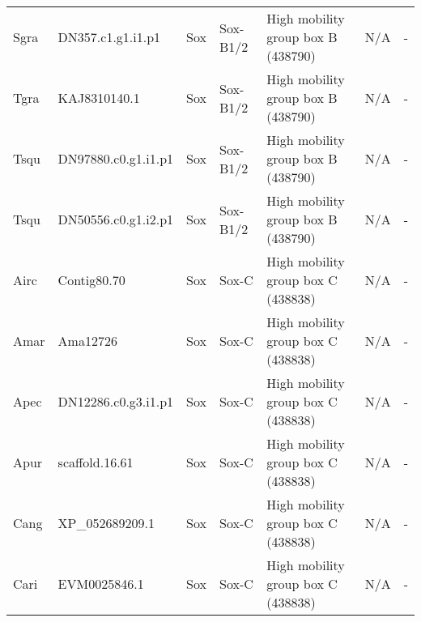 \documentclass[../main.tex]{subfiles}
\begin{document}
\begin{landscape}
\begin{longtable}{lllllll}
		Sgra           & DN357.c1.g1.i1.p1     & Sox            & Sox-B1/2            & High mobility group box B (438790)          & N/A                                                                    & -                    \\
		Tgra           & KAJ8310140.1          & Sox            & Sox-B1/2            & High mobility group box B (438790)          & N/A                                                                    & -                    \\
		Tsqu           & DN97880.c0.g1.i1.p1   & Sox            & Sox-B1/2            & High mobility group box B (438790)          & N/A                                                                    & -                    \\
		Tsqu           & DN50556.c0.g1.i2.p1   & Sox            & Sox-B1/2            & High mobility group box B (438790)          & N/A                                                                    & -                    \\
		Airc           & Contig80.70           & Sox            & Sox-C               & High mobility group box C (438838)          & N/A                                                                    & -                    \\
		Amar           & Ama12726              & Sox            & Sox-C               & High mobility group box C (438838)          & N/A                                                                    & -                    \\
		Apec           & DN12286.c0.g3.i1.p1   & Sox            & Sox-C               & High mobility group box C (438838)          & N/A                                                                    & -                    \\
		Apur           & scaffold.16.61        & Sox            & Sox-C               & High mobility group box C (438838)          & N/A                                                                    & -                    \\
		Cang           & XP\_052689209.1       & Sox            & Sox-C               & High mobility group box C (438838)          & N/A                                                                    & -                    \\
		Cari           & EVM0025846.1          & Sox            & Sox-C               & High mobility group box C (438838)          & N/A                                                                    & -                    \\

\end{longtable}
\end{landscape}
\end{document}

